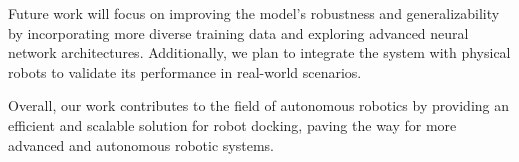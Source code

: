\documentclass{article}
\begin{document}
Future work will focus on improving the model's robustness and generalizability by incorporating more diverse training data and exploring advanced neural network architectures. Additionally, we plan to integrate the system with physical robots to validate its performance in real-world scenarios.

Overall, our work contributes to the field of autonomous robotics by providing an efficient and scalable solution for robot docking, paving the way for more advanced and autonomous robotic systems.


\end{document}

